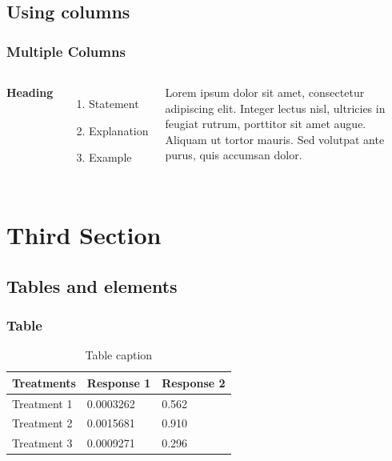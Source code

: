 \documentclass[aspectratio=169]{beamer}
\begin{document}

\subsection{Using columns}


\begin{frame}
\frametitle{Multiple Columns}
\begin{columns}[c] %

\textbf{Heading}
\begin{enumerate}
\item Statement
\item Explanation
\item Example
\end{enumerate}

Lorem ipsum dolor sit amet, consectetur adipiscing elit. Integer lectus nisl, ultricies in feugiat rutrum, porttitor sit amet augue. Aliquam ut tortor mauris. Sed volutpat ante purus, quis accumsan dolor.

\end{columns}
\end{frame}

\section{Third Section}

\subsection{Tables and elements}

\begin{frame}
\frametitle{Table}
\begin{table}[H] %
\begin{tabular}{l l l} \hline
\textbf{Treatments} & \textbf{Response 1} & \textbf{Response 2}\\ \hline \hline
Treatment 1 & 0.0003262 & 0.562 \\
Treatment 2 & 0.0015681 & 0.910 \\
Treatment 3 & 0.0009271 & 0.296 \\ \hline
\end{tabular}
\caption{Table caption}
\end{table}

\end{frame}
\end{document}
